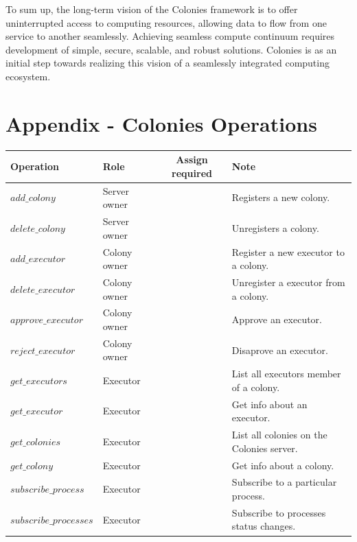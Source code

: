 \documentclass{article}
\begin{document}
To sum up, the long-term vision of the Colonies framework is to offer uninterrupted access to computing resources, allowing data to flow from one service to another seamlessly. Achieving seamless compute continuum requires development of simple, secure, scalable, and robust solutions. Colonies is as an initial step towards realizing this vision of a seamlessly integrated computing ecosystem.


 

\newpage
\appendix
\section{Appendix - Colonies Operations}
\begin{table}[h]
	\centering
	\begin{tabular}{llcl}
		\toprule
		\cmidrule(r){1-4}
        Operation                  & Role         & Assign required & Note \\
		\midrule
        \(add\_colony\)            & Server owner &            & Registers a new colony. \\
        \(delete\_colony\)         & Server owner &            & Unregisters a colony. \\
        \(add\_executor\)          & Colony owner &            & Register a new executor to a colony. \\
        \(delete\_executor\)       & Colony owner &            & Unregister a executor from a colony. \\
        \(approve\_executor\)      & Colony owner &            & Approve an executor. \\
        \(reject\_executor\)       & Colony owner &            & Disaprove an executor. \\
        \(get\_executors\)         & Executor     &            & List all executors member of a colony. \\
        \(get\_executor\)          & Executor     &            & Get info about an executor. \\
        \(get\_colonies\)          & Executor     &            & List all colonies on the Colonies server. \\
        \(get\_colony\)            & Executor     &            & Get info about a colony. \\
        \(subscribe\_process\)     & Executor     &            & Subscribe to a particular process. \\
        \(subscribe\_processes\)   & Executor     &            & Subscribe to processes status changes. \\

\end{tabular}
\end{table}
\end{document}
